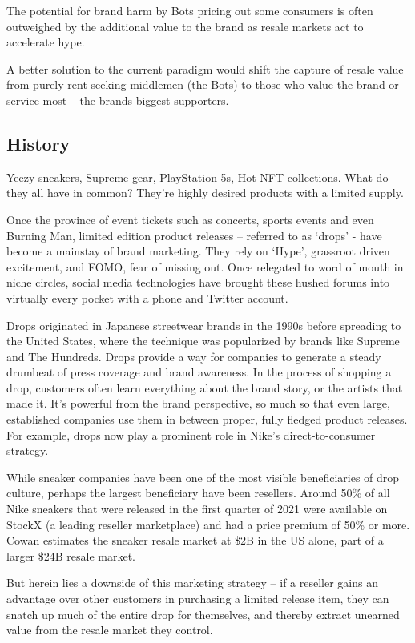 \documentclass[runningheads]{llncs}
\begin{document}
The potential for brand harm by Bots pricing out some consumers is often outweighed by the additional value to the brand as resale markets act to accelerate hype.

A better solution to the current paradigm would shift the capture of resale value from purely rent seeking middlemen (the Bots) to those who value the brand or service most – the brands biggest supporters. 

\subsection{History}
Yeezy sneakers, Supreme gear, PlayStation 5s, Hot NFT collections.  What do they all have in common?  They’re highly desired products with a limited supply.

Once the province of event tickets such as concerts, sports events and even Burning Man, limited edition product releases – referred to as ‘drops’ - have become a mainstay of brand marketing.  They rely on ‘Hype’, grassroot driven excitement, and FOMO, fear of missing out.  Once relegated to word of mouth in niche circles, social media technologies have brought these hushed forums into virtually every pocket with a phone and Twitter account.\cite{drop-culture-Fox-2021}

Drops originated in Japanese streetwear brands in the 1990s before spreading to the United States, where the technique was popularized by brands like Supreme and The Hundreds.  Drops provide a way for companies to generate a steady drumbeat of press coverage and brand awareness.  In the process of shopping a drop, customers often learn everything about the brand story, or the artists that made it.  It’s powerful from the brand perspective, so much so that even large, established companies use them in between proper, fully fledged product releases.  For example, drops now play a prominent role in Nike’s direct-to-consumer strategy.\cite{drops-sneakers-Koss-2021}

While sneaker companies have been one of the most visible beneficiaries of drop culture, perhaps the largest beneficiary have been resellers.  Around 50\% of all Nike sneakers that were released in the first quarter of 2021 were available on StockX (a leading reseller marketplace) and had a price premium of 50\% or more.  Cowan estimates the sneaker resale market at \$2B in the US alone, part of a larger \$24B resale market.\cite{bots-gifts-Hunt-2021}

But herein lies a downside of this marketing strategy – if a reseller gains an advantage over other customers in purchasing a limited release item, they can snatch up much of the entire drop for themselves, and thereby extract unearned value from the resale market they control.
\end{document}
